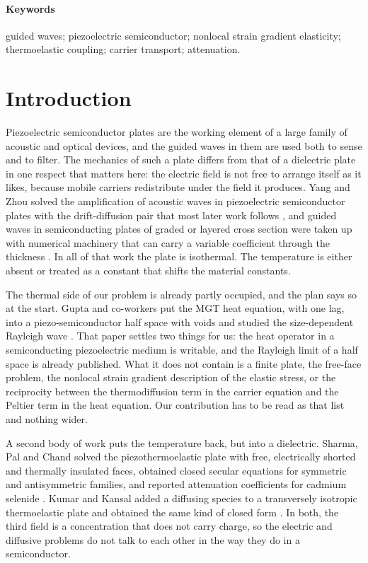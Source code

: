 \documentclass[11pt]{article}
\begin{document}
\paragraph{Keywords} guided waves; piezoelectric semiconductor; nonlocal strain gradient elasticity;
thermoelastic coupling; carrier transport; attenuation.

\section{Introduction}

Piezoelectric semiconductor plates are the working element of a large family of acoustic and optical
devices, and the guided waves in them are used both to sense and to filter. The mechanics of such a plate
differs from that of a dielectric plate in one respect that matters here: the electric field is not free to
arrange itself as it likes, because mobile carriers redistribute under the field it produces. Yang and Zhou
solved the amplification of acoustic waves in piezoelectric semiconductor plates with the drift-diffusion
pair that most later work follows \cite{YangZhou2005}, and guided waves in semiconducting plates of graded
or layered cross section were taken up with numerical machinery that can carry a variable coefficient
through the thickness \cite{Othmani2017}. In all of that work the plate is isothermal. The temperature is
either absent or treated as a constant that shifts the material constants.

The thermal side of our problem is already partly occupied, and the plan says so at the start. Gupta and
co-workers put the MGT heat equation, with one lag, into a piezo-semiconductor half space with
voids and studied the size-dependent Rayleigh wave \cite{Gupta2025}. That paper settles two things for us:
the heat operator in a semiconducting piezoelectric medium is writable, and the Rayleigh limit of a
half space is already published. What it does not contain is a finite plate, the free-face problem, the
nonlocal strain gradient description of the elastic stress, or the reciprocity between the thermodiffusion
term in the carrier equation and the Peltier term in the heat equation. Our contribution has to be read as
that list and nothing wider.

A second body of work puts the temperature back, but into a dielectric. Sharma, Pal and Chand solved the
piezothermoelastic plate with free, electrically shorted and thermally insulated faces, obtained closed
secular equations for symmetric and antisymmetric families, and reported attenuation coefficients for
cadmium selenide \cite{Sharma2004}. Kumar and Kansal added a diffusing species to a transversely isotropic
thermoelastic plate and obtained the same kind of closed form \cite{KumarKansal2008}. In both, the third
field is a concentration that does not carry charge, so the electric and diffusive problems do not talk to
each other in the way they do in a semiconductor.
\end{document}
